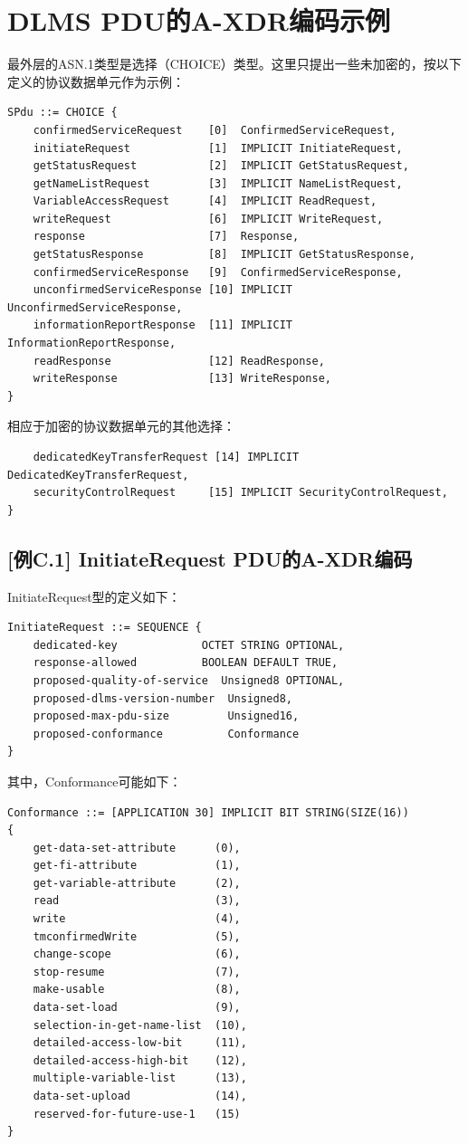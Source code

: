 \documentclass[a4paper,11pt]{ctexart}
\begin{document}
\section{DLMS PDU的A-XDR编码示例}

最外层的ASN.1类型是选择（CHOICE）类型。这里只提出一些未加密的，按以下定义的协议数据单元作为示例：
\begin{verbatim}
SPdu ::= CHOICE {
    confirmedServiceRequest    [0]  ConfirmedServiceRequest,
    initiateRequest            [1]  IMPLICIT InitiateRequest,
    getStatusRequest           [2]  IMPLICIT GetStatusRequest,
    getNameListRequest         [3]  IMPLICIT NameListRequest,
    VariableAccessRequest      [4]  IMPLICIT ReadRequest,
    writeRequest               [6]  IMPLICIT WriteRequest,
    response                   [7]  Response,
    getStatusResponse          [8]  IMPLICIT GetStatusResponse,
    confirmedServiceResponse   [9]  ConfirmedServiceResponse,
    unconfirmedServiceResponse [10] IMPLICIT UnconfirmedServiceResponse,
    informationReportResponse  [11] IMPLICIT InformationReportResponse,
    readResponse               [12] ReadResponse,
    writeResponse              [13] WriteResponse,
}
\end{verbatim}

\noindent 相应于加密的协议数据单元的其他选择：
\begin{verbatim}
    dedicatedKeyTransferRequest [14] IMPLICIT DedicatedKeyTransferRequest,
    securityControlRequest     [15] IMPLICIT SecurityControlRequest,
}
\end{verbatim}

\subsection{[例C.1] InitiateRequest PDU的A-XDR编码}

InitiateRequest型的定义如下：
\begin{verbatim}
InitiateRequest ::= SEQUENCE {
    dedicated-key             OCTET STRING OPTIONAL,
    response-allowed          BOOLEAN DEFAULT TRUE,
    proposed-quality-of-service  Unsigned8 OPTIONAL,
    proposed-dlms-version-number  Unsigned8,
    proposed-max-pdu-size         Unsigned16,
    proposed-conformance          Conformance
}
\end{verbatim}

\noindent 其中，Conformance可能如下：
\begin{verbatim}
Conformance ::= [APPLICATION 30] IMPLICIT BIT STRING(SIZE(16))
{
    get-data-set-attribute      (0),
    get-fi-attribute            (1),
    get-variable-attribute      (2),
    read                        (3),
    write                       (4),
    tmconfirmedWrite            (5),
    change-scope                (6),
    stop-resume                 (7),
    make-usable                 (8),
    data-set-load               (9),
    selection-in-get-name-list  (10),
    detailed-access-low-bit     (11),
    detailed-access-high-bit    (12),
    multiple-variable-list      (13),
    data-set-upload             (14),
    reserved-for-future-use-1   (15)
}
\end{verbatim}
\end{document}
